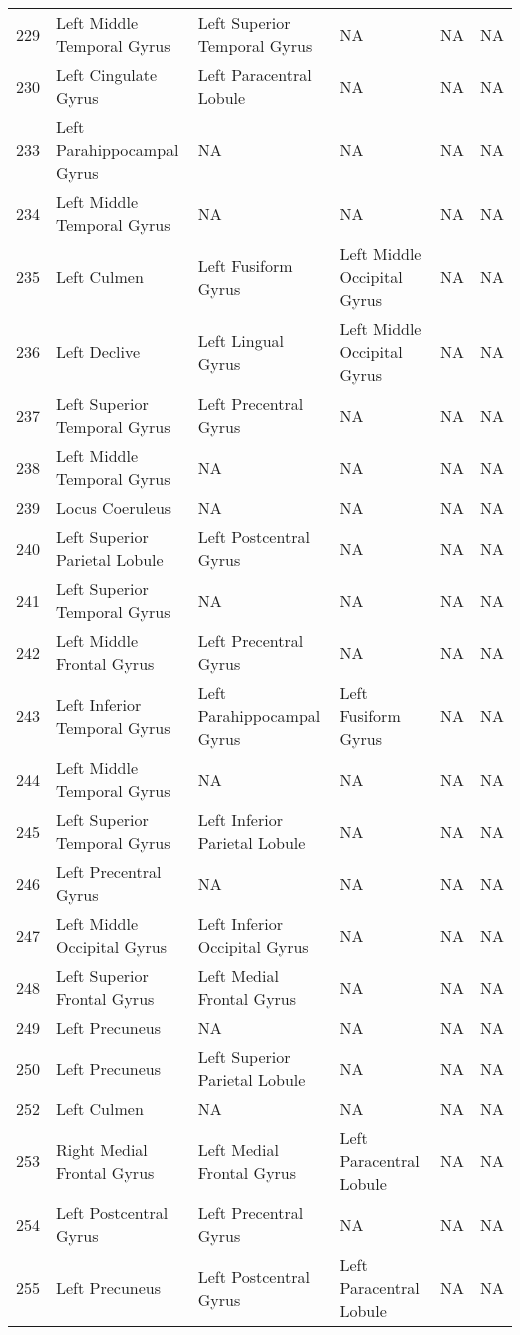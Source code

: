 \documentclass[10pt,letterpaper]{article}\usepackage[]{graphicx}\usepackage[]{color}
\begin{document}
\begin{center}
\begin{longtable}[c]{cP{1.1in}P{1.1in}P{1.1in}P{1.1in}P{1.1in}}
		229	& Left Middle Temporal Gyrus & Left Superior Temporal Gyrus	& NA & NA & NA \\
		230	& Left Cingulate Gyrus & Left Paracentral Lobule & NA & NA & NA \\
		233	& Left Parahippocampal Gyrus & NA & NA & NA	& NA \\
		234	& Left Middle Temporal Gyrus & NA & NA & NA & NA \\
		235	& Left Culmen & Left Fusiform Gyrus	& Left Middle Occipital Gyrus & NA & NA \\
		236	& Left Declive & Left Lingual Gyrus	& Left Middle Occipital Gyrus & NA & NA \\
		237	& Left Superior Temporal Gyrus & Left Precentral Gyrus & NA	& NA & NA \\
		238	& Left Middle Temporal Gyrus & NA & NA & NA	& NA \\
		239	& Locus Coeruleus & NA & NA	& NA & NA \\
		240	& Left Superior Parietal Lobule	& Left Postcentral Gyrus & NA & NA & NA \\
		241	& Left Superior Temporal Gyrus & NA	& NA & NA & NA \\
		242	& Left Middle Frontal Gyrus	& Left Precentral Gyrus	& NA & NA & NA \\
		243	& Left Inferior Temporal Gyrus & Left Parahippocampal Gyrus	& Left Fusiform Gyrus & NA & NA \\
		244	& Left Middle Temporal Gyrus & NA & NA & NA	& NA \\
		245	& Left Superior Temporal Gyrus & Left Inferior Parietal Lobule & NA	& NA & NA \\
		246	& Left Precentral Gyrus	& NA & NA & NA & NA \\
		247	& Left Middle Occipital Gyrus & Left Inferior Occipital Gyrus & NA & NA	& NA \\
		248	& Left Superior Frontal Gyrus & Left Medial Frontal Gyrus & NA & NA & NA \\
		249	& Left Precuneus & NA & NA & NA	& NA \\
		250	& Left Precuneus & Left Superior Parietal Lobule & NA & NA & NA \\
		252	& Left Culmen & NA & NA	& NA & NA \\
		253	& Right Medial Frontal Gyrus & Left Medial Frontal Gyrus & Left Paracentral Lobule & NA	& NA \\
		254	& Left Postcentral Gyrus & Left Precentral Gyrus & NA & NA & NA \\
		255	& Left Precuneus & Left Postcentral Gyrus & Left Paracentral Lobule & NA & NA \\

\end{longtable}
\end{center}
\end{document}
